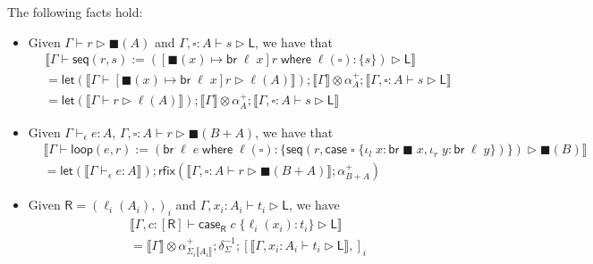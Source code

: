 \documentclass[acmsmall,screen,review]{acmart}
\newcommand{\ms}[1]{\ensuremath{\mathsf{#1}}}
\newcommand{\lto}{:}
\newcommand{\linl}[1]{\iota_l\;{#1}}
\newcommand{\linr}[1]{\iota_r\;{#1}}
\newcommand{\brb}[2]{\ms{br}\;#1\;#2}
\newcommand{\casestmt}[5]{\ms{case}\;#1\;\{\linl{#2} \lto #3, \linr{#4} \lto #5\}}
\newcommand{\where}[2]{#1\;\ms{where}\;#2}
\newcommand{\wbranch}[3]{#1(#2) \lto \{#3\}}
\newcommand{\bhyp}[2]{#1 : #2}
\newcommand{\hasty}[4]{#1 \vdash_{#2} #3: {#4}}
\newcommand{\haslb}[3]{#1 \vdash #2 \rhd #3}
\newcommand{\dnt}[1]{\llbracket{#1}\rrbracket}
\newcommand{\lmor}[1]{\ms{let}(#1)}
\newcommand{\rfix}[1]{\ms{rfix}(#1)}
\newcommand{\invar}{\square}
\newcommand{\outlb}{\blacksquare}
\begin{document}
\begin{lemma}
  The following facts hold:
  \begin{itemize}
    \item Given $\haslb{\Gamma}{r}{\outlb(A)}$ and $\haslb{\Gamma, \bhyp{\invar}{A}}{s}{\ms{L}}$,
    we have that
    \begin{equation}
      \begin{aligned}
      & \dnt{\haslb{\Gamma}{\ms{seq}(r, s) 
        := (\where{[\outlb(x) \mapsto \brb{\ell}{x}]r}{\wbranch{\ell}{\invar}{s}})}{\ms{L}}} \\
      & = \lmor{\dnt{\haslb{\Gamma}{[\outlb(x) \mapsto \brb{\ell}{x}]r}{\ell(A)}}} 
        ; \dnt{\Gamma} \otimes \alpha^+_A 
        ; \dnt{\haslb{\Gamma, \bhyp{\invar}{A}}{s}{\ms{L}}} \\
      & = \lmor{\dnt{\haslb{\Gamma}{r}{\ell(A)}}} 
        ; \dnt{\Gamma} \otimes \alpha^+_A 
        ; \dnt{\haslb{\Gamma, \bhyp{\invar}{A}}{s}{\ms{L}}}
      \end{aligned}
    \end{equation}
    \item Given $\hasty{\Gamma}{\epsilon}{e}{A}$, %
                $\haslb{\Gamma, \bhyp{\invar}{A}}{r}{\outlb(B + A)}$,
    we have that
    \begin{equation}
      \begin{aligned}
      & \dnt{\haslb{\Gamma}{\ms{loop}(e, r) 
        := (\where{\brb{\ell}{e}}{\wbranch{\ell}{\invar}
        {\ms{seq}(r, \casestmt{\invar}{x}{\brb{\outlb}{x}}{y}{\brb{\ell}{y}})}})}{\outlb(B)}} \\
      & = \lmor{\dnt{\hasty{\Gamma}{\epsilon}{e}{A}}}
        ; \rfix{\dnt{\haslb{\Gamma, \bhyp{\invar}{A}}{r}{\outlb(B + A)}} ; \alpha^+_{B + A}}
      \end{aligned}
    \end{equation}
    \item Given $\ms{R} = (\ell_i(A_i),)_i$ and $\haslb{\Gamma, \bhyp{x_i}{A_i}}{t_i}{\ms{L}}$, we
    have
    \begin{equation}
      \begin{aligned}
        & \dnt{
          \haslb{\Gamma, \bhyp{c}{[\ms{R}]}}{\ms{case}_{\ms{R}}\;c\; \{\ell_i(x_i) : t_i\}}{\ms{L}}
          } \\
        & = \dnt{\Gamma} \otimes \alpha^+_{\Sigma_i\dnt{A_i}} ; \delta^{-1}_{\Sigma}
          ; [\dnt{\haslb{\Gamma, \bhyp{x_i}{A_i}}{t_i}{\ms{L}}},]_i
      \end{aligned}
    \end{equation}

\end{itemize}
\end{lemma}
\end{document}
